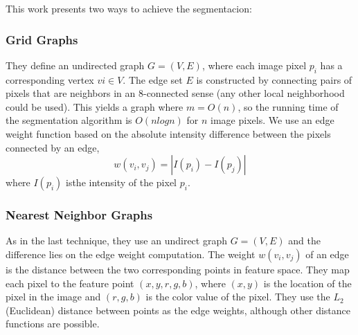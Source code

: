 This work presents two ways to achieve the segmentacion:

\subsubsection{Grid Graphs}
They define an undirected graph $G = (V, E)$, where each image pixel $p_i$ has a corresponding vertex $vi \in V$. The edge set $E$ is constructed by connecting pairs of pixels that are neighbors in an 8-connected sense (any other local neighborhood could be used). This yields a graph where $m = O(n)$, so the running time of the segmentation algorithm is $O(n log n)$ for $n$ image pixels. We use an edge weight function based on the absolute intensity difference between the pixels connected by an edge, $$w(v_i, v_j) = |I(p_i) - I(p_j)|$$ where $I(p_i)$ isthe intensity of the pixel $p_i$.


\subsubsection{Nearest Neighbor Graphs}
As in the last technique, they use an undirect graph $G = (V, E)$ and the difference lies on the edge weight computation. The weight $w(v_i, v_j)$ of an edge is the distance between the two corresponding points in feature space. They map each pixel to the feature point $(x, y,r, g, b)$, where $(x, y)$ is the location of the pixel in the image and $(r, g, b)$ is the color value of the pixel. They use the $L_2$ (Euclidean) distance between points as the edge weights, although other distance functions are possible.


